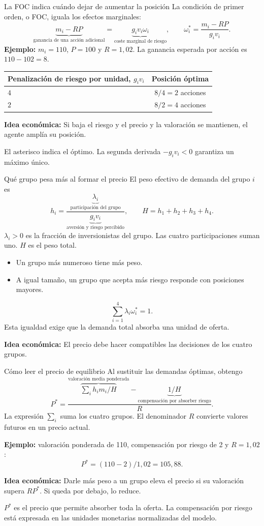 \documentclass[aspectratio=169,11pt]{beamer}
\newcommand{\idea}[1]{\par\medskip\textbf{Idea económica:} #1}
\begin{document}
\begin{frame}{La FOC indica cuándo dejar de aumentar la posición}
 La condición de primer orden, o FOC, iguala los efectos marginales:
 \[
  \underbrace{m_i-RP}_{\text{ganancia de una acción adicional}}
  =\underbrace{g_iv_i\omega_i}_{\text{coste marginal de riesgo}},
  \qquad
  \omega_i^*=\frac{m_i-RP}{g_iv_i}.
 \]
 \textbf{Ejemplo:} \(m_i=110\), \(P=100\) y \(R=1{,}02\).
 La ganancia esperada por acción es \(110-102=8\).
 \begin{center}
 \begin{tabular}{lc}
 \toprule
 Penalización de riesgo por unidad, \(g_iv_i\) & Posición óptima\\
 \midrule
 \(4\) & \(8/4=2\) acciones\\
 \(2\) & \(8/2=4\) acciones\\
 \bottomrule
 \end{tabular}
 \end{center}
 \idea{Si baja el riesgo y el precio y la valoración se mantienen, el agente amplía su posición.}
 \small\par\smallskip
 El asterisco indica el óptimo. La segunda derivada \(-g_iv_i<0\)
 garantiza un máximo único.
\end{frame}
\begin{frame}{Qué grupo pesa más al formar el precio}
 El peso efectivo de demanda del grupo \(i\) es
 \[
  h_i=\frac{\underbrace{\lambda_i}_{\text{participación del grupo}}}
            {\underbrace{g_iv_i}_{\text{aversión y riesgo percibido}}},
  \qquad H=h_1+h_2+h_3+h_4.
 \]
 \(\lambda_i>0\) es la fracción de inversionistas del grupo.
 Las cuatro participaciones suman uno. \(H\) es el peso total.
 \begin{itemize}
  \item Un grupo más numeroso tiene más peso.
  \item A igual tamaño, un grupo que acepta más riesgo responde con posiciones mayores.
 \end{itemize}
 \[
  \sum_{i=1}^4\lambda_i\omega_i^*=1.
 \]
 Esta igualdad exige que la demanda total absorba una unidad de oferta.
 \idea{El precio debe hacer compatibles las decisiones de los cuatro grupos.}
\end{frame}
\begin{frame}{Cómo leer el precio de equilibrio}
 Al sustituir las demandas óptimas, obtengo
 \[
  P^*=\frac{\overbrace{\sum_i h_im_i/H}^{\text{valoración media ponderada}}
                -\underbrace{1/H}_{\text{compensación por absorber riesgo}}}{R}.
 \]
 La expresión \(\sum_i\) suma los cuatro grupos.
 El denominador \(R\) convierte valores futuros en un precio actual.
 \medskip
 \par\textbf{Ejemplo:} valoración ponderada de 110,
 compensación por riesgo de 2 y \(R=1{,}02\):
 \[
  P^*=(110-2)/1{,}02=105{,}88.
 \]
 \idea{Darle más peso a un grupo eleva el precio si su valoración supera \(RP^*\). Si queda por debajo, lo reduce.}
 \small\par\medskip
 \(P^*\) es el precio que permite absorber toda la oferta.
 La compensación por riesgo está expresada en las unidades monetarias normalizadas del modelo.
\end{frame}
\end{document}
